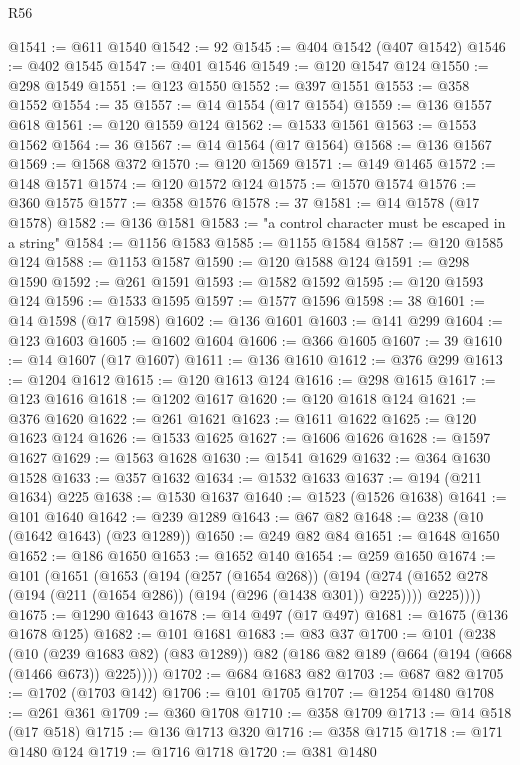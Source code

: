 \begin{lexlean}{R56}
\begin{coremodule}
@1541 := @611 @1540
@1542 := 92
@1545 := @404 @1542 (@407 @1542)
@1546 := @402 @1545
@1547 := @401 @1546
@1549 := @120 @1547 @124
@1550 := @298 @1549
@1551 := @123 @1550
@1552 := @397 @1551
@1553 := @358 @1552
@1554 := 35
@1557 := @14 @1554 (@17 @1554)
@1559 := @136 @1557 @618
@1561 := @120 @1559 @124
@1562 := @1533 @1561
@1563 := @1553 @1562
@1564 := 36
@1567 := @14 @1564 (@17 @1564)
@1568 := @136 @1567
@1569 := @1568 @372
@1570 := @120 @1569
@1571 := @149 @1465
@1572 := @148 @1571
@1574 := @120 @1572 @124
@1575 := @1570 @1574
@1576 := @360 @1575
@1577 := @358 @1576
@1578 := 37
@1581 := @14 @1578 (@17 @1578)
@1582 := @136 @1581
@1583 := "a control character must be escaped in a string"
@1584 := @1156 @1583
@1585 := @1155 @1584
@1587 := @120 @1585 @124
@1588 := @1153 @1587
@1590 := @120 @1588 @124
@1591 := @298 @1590
@1592 := @261 @1591
@1593 := @1582 @1592
@1595 := @120 @1593 @124
@1596 := @1533 @1595
@1597 := @1577 @1596
@1598 := 38
@1601 := @14 @1598 (@17 @1598)
@1602 := @136 @1601
@1603 := @141 @299
@1604 := @123 @1603
@1605 := @1602 @1604
@1606 := @366 @1605
@1607 := 39
@1610 := @14 @1607 (@17 @1607)
@1611 := @136 @1610
@1612 := @376 @299
@1613 := @1204 @1612
@1615 := @120 @1613 @124
@1616 := @298 @1615
@1617 := @123 @1616
@1618 := @1202 @1617
@1620 := @120 @1618 @124
@1621 := @376 @1620
@1622 := @261 @1621
@1623 := @1611 @1622
@1625 := @120 @1623 @124
@1626 := @1533 @1625
@1627 := @1606 @1626
@1628 := @1597 @1627
@1629 := @1563 @1628
@1630 := @1541 @1629
@1632 := @364 @1630 @1528
@1633 := @357 @1632
@1634 := @1532 @1633
@1637 := @194 (@211 @1634) @225
@1638 := @1530 @1637
@1640 := @1523 (@1526 @1638)
@1641 := @101 @1640
@1642 := @239 @1289
@1643 := @67 @82
@1648 := @238 (@10 (@1642 @1643) (@23 @1289))
@1650 := @249 @82 @84
@1651 := @1648 @1650
@1652 := @186 @1650
@1653 := @1652 @140
@1654 := @259 @1650
@1674 := @101
    (@1651
      (@1653
        (@194
          (@257 (@1654 @268))
          (@194
            (@274 (@1652 @278 (@194 (@211 (@1654 @286)) (@194 (@296 (@1438 @301)) @225))))
            @225))))
@1675 := @1290 @1643
@1678 := @14 @497 (@17 @497)
@1681 := @1675 (@136 @1678 @125)
@1682 := @101 @1681
@1683 := @83 @37
@1700 := @101
    (@238
      (@10 (@239 @1683 @82) (@83 @1289))
      @82
      (@186 @82 @189 (@664 (@194 (@668 (@1466 @673)) @225))))
@1702 := @684 @1683 @82
@1703 := @687 @82
@1705 := @1702 (@1703 @142)
@1706 := @101 @1705
@1707 := @1254 @1480
@1708 := @261 @361
@1709 := @360 @1708
@1710 := @358 @1709
@1713 := @14 @518 (@17 @518)
@1715 := @136 @1713 @320
@1716 := @358 @1715
@1718 := @171 @1480 @124
@1719 := @1716 @1718
@1720 := @381 @1480

\end{coremodule}
\end{lexlean}
